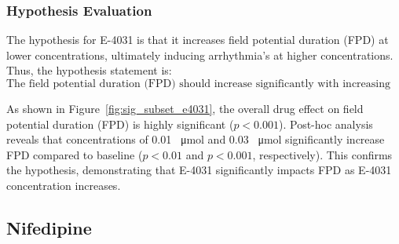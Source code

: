 \documentclass{report}
\begin{document}
        \subsubsection{Hypothesis Evaluation}
            The hypothesis for E-4031 is that it increases field potential duration (FPD) at lower concentrations, ultimately inducing arrhythmia's at higher concentrations. Thus, the hypothesis statement is:
            \[
            \text{The field potential duration (FPD) should increase significantly with increasing E-4031 concentration.}
            \]
            
            As shown in Figure~\ref{fig:sig_subset_e4031}, the overall drug effect on field potential duration (FPD) is highly significant (\(p < 0.001\)). Post-hoc analysis reveals that concentrations of 0.01 \SI{}{\umol} and 0.03 \SI{}{\umol} significantly increase FPD compared to baseline (\(p < 0.01\) and \(p < 0.001\), respectively). This confirms the hypothesis, demonstrating that E-4031 significantly impacts FPD as E-4031 concentration increases.
        
    \subsection {Nifedipine} 
     \label{nifedipine-significance-analysis}
\end{document}
